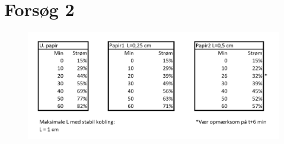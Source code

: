 \chapter{Forsøg 2} \label{bilag:forsg2}

\begin{figure}[htbp]

\centering
\includegraphics[width=1\textwidth]{Setup/forsg_2_bilag2}
\label{figure:forsg2}

\end{figure}
